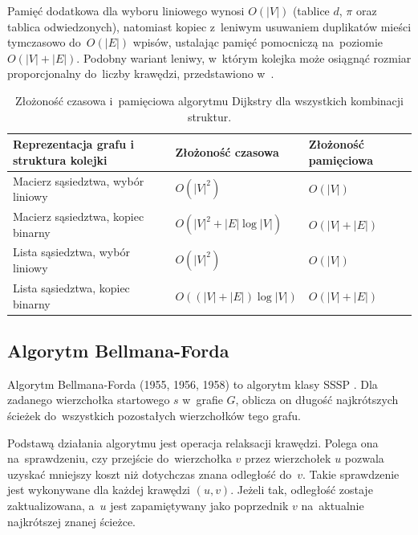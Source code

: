 \documentclass[11pt,a4paper,oneside]{report}
\begin{document}
Pamięć dodatkowa dla wyboru liniowego wynosi $O(|V|)$ (tablice $d$, $\pi$ oraz tablica odwiedzonych), natomiast kopiec z~leniwym usuwaniem duplikatów mieści tymczasowo do~$O(|E|)$ wpisów, ustalając pamięć pomocniczą na~poziomie $O(|V| + |E|)$. Podobny wariant leniwy, w~którym kolejka może osiągnąć rozmiar proporcjonalny do~liczby krawędzi, przedstawiono w~\cite{sedgewick-2025-lazydijkstra}.

\begin{table}[H]
  \centering
  \small
  \renewcommand{\arraystretch}{1.25}
  \begin{tabularx}{\textwidth}{@{}l>{\centering\arraybackslash}X>{\centering\arraybackslash}X@{}}
    \toprule
    \textbf{Reprezentacja grafu i struktura kolejki} & \textbf{Złożoność czasowa} & \textbf{Złożoność pamięciowa} \\
    \midrule
    Macierz sąsiedztwa, wybór liniowy & $O(|V|^2)$ & $O(|V|)$ \\
    Macierz sąsiedztwa, kopiec binarny & $O(|V|^2 + |E|\log |V|)$ & $O(|V| + |E|)$ \\
    Lista sąsiedztwa, wybór liniowy & $O(|V|^2)$ & $O(|V|)$ \\
    Lista sąsiedztwa, kopiec binarny & $O((|V|+|E|)\log |V|)$ & $O(|V| + |E|)$ \\
    \bottomrule
  \end{tabularx}
  \caption{Złożoność czasowa i~pamięciowa algorytmu Dijkstry dla wszystkich kombinacji struktur.}
  \label{tab:zlozonosc-dijkstry}
\end{table}

\newpage

\subsection{Algorytm Bellmana-Forda}

Algorytm Bellmana-Forda (1955, 1956, 1958) to algorytm klasy SSSP \cite{stanford-2026-bellmanfordfloydwarshall}. Dla zadanego wierzchołka startowego $s$ w~grafie $G$, oblicza on długość najkrótszych ścieżek do~wszystkich pozostałych wierzchołków tego grafu.

Podstawą działania algorytmu jest operacja relaksacji krawędzi. Polega ona na~sprawdzeniu, czy przejście do~wierzchołka $v$ przez wierzchołek $u$ pozwala uzyskać mniejszy koszt niż dotychczas znana odległość do~$v$. Takie sprawdzenie jest wykonywane dla każdej krawędzi $(u,v)$. Jeżeli tak, odległość zostaje zaktualizowana, a~$u$ jest zapamiętywany jako poprzednik $v$ na~aktualnie najkrótszej znanej ścieżce.
\end{document}
